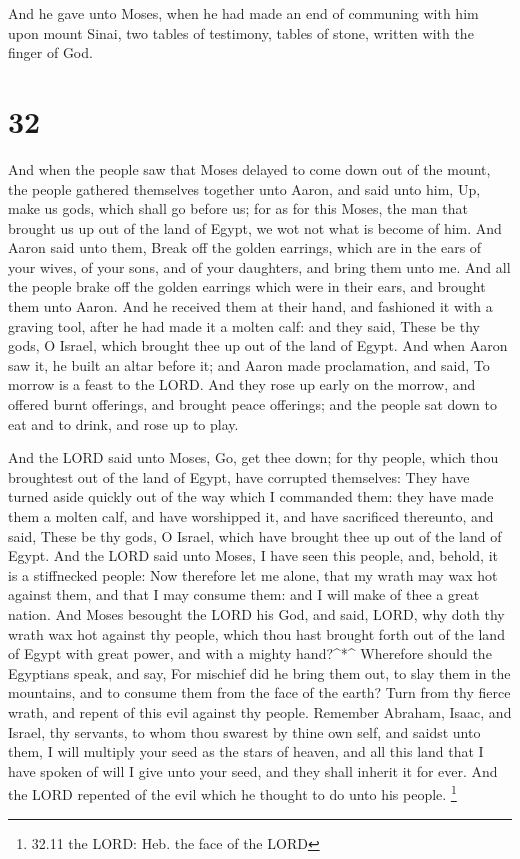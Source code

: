  And he gave unto Moses, when he had made an end of
communing with him upon mount Sinai, two tables of testimony, tables of
stone, written with the finger of God.

\hypertarget{section-31}{%
\section{32}\label{section-31}}

 And when the people saw that Moses delayed to come down out
of the mount, the people gathered themselves together unto Aaron, and
said unto him, Up, make us gods, which shall go before us; for as for
this Moses, the man that brought us up out of the land of Egypt, we wot
not what is become of him.  And Aaron said unto them, Break
off the golden earrings, which are in the ears of your wives, of your
sons, and of your daughters, and bring them unto me.  And
all the people brake off the golden earrings which were in their ears,
and brought them unto Aaron.  And he received them at their
hand, and fashioned it with a graving tool, after he had made it a
molten calf: and they said, These be thy gods, O Israel, which brought
thee up out of the land of Egypt.  And when Aaron saw it, he
built an altar before it; and Aaron made proclamation, and said, To
morrow is a feast to the LORD.  And they rose up early on
the morrow, and offered burnt offerings, and brought peace offerings;
and the people sat down to eat and to drink, and rose up to play.

 And the LORD said unto Moses, Go, get thee down; for thy
people, which thou broughtest out of the land of Egypt, have corrupted
themselves:  They have turned aside quickly out of the way
which I commanded them: they have made them a molten calf, and have
worshipped it, and have sacrificed thereunto, and said, These be thy
gods, O Israel, which have brought thee up out of the land of Egypt.
 And the LORD said unto Moses, I have seen this people, and,
behold, it is a stiffnecked people:  Now therefore let me
alone, that my wrath may wax hot against them, and that I may consume
them: and I will make of thee a great nation.  And Moses
besought the LORD his God, and said, LORD, why doth thy wrath wax hot
against thy people, which thou hast brought forth out of the land of
Egypt with great power, and with a mighty hand?\^{}*\^{} 
Wherefore should the Egyptians speak, and say, For mischief did he bring
them out, to slay them in the mountains, and to consume them from the
face of the earth? Turn from thy fierce wrath, and repent of this evil
against thy people.  Remember Abraham, Isaac, and Israel,
thy servants, to whom thou swarest by thine own self, and saidst unto
them, I will multiply your seed as the stars of heaven, and all this
land that I have spoken of will I give unto your seed, and they shall
inherit it for ever.  And the LORD repented of the evil
which he thought to do unto his people. \footnote{32.11 the LORD: Heb.
  the face of the LORD}

